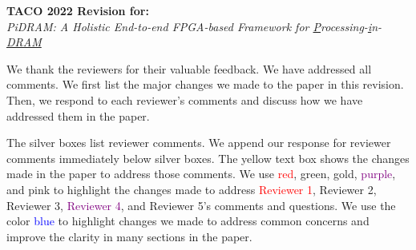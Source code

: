 


\begin{center}
    \LARGE{\textbf{TACO 2022 Revision for:}}\\
    \LARGE{\textit{PiDRAM: A Holistic End-to-end FPGA-based Framework for \underline{P}rocessing-\underline{i}n-\underline{DRAM}}}
\end{center}

\vspace{10pt}

We thank the reviewers for their valuable feedback. We have addressed all comments. We first list the major changes we made to the paper in this revision. Then, we respond to each reviewer’s comments and discuss how we have addressed them in the paper.

The silver boxes list reviewer comments. We append our response for reviewer comments immediately below silver boxes. The yellow text box shows the changes made in the paper to address those comments. We use \textcolor{red}{red}, \textcolor{dark-green}{green}, \textcolor{goldbutdark}{gold}, \textcolor{purple}{purple}, and \textcolor{pink-hot}{pink} to highlight the changes made to address \textcolor{red}{Reviewer 1}, \textcolor{dark-green}{Reviewer 2}, \textcolor{goldbutdark}{Reviewer 3}, \textcolor{purple}{Reviewer 4}, and \textcolor{pink-hot}{Reviewer 5}'s comments and questions. We use the color \textcolor{blue}{blue} to highlight changes we made to address common concerns and improve the clarity in many sections in the paper.\\

\iffalse
\newcommand{\tacoreva}[1]{\textcolor{red}{#1}}
\definecolor{dark-green}{rgb}{0.00, 0.45, 0.00}
\newcommand{\tacorevb}[1]{\textcolor{dark-green}{#1}}
\definecolor{goldbutdark}{rgb}{0.85, 0.65, 0.12}
\newcommand{\tacorevc}[1]{\textcolor{goldbutdark}{#1}}
\newcommand{\tacorevd}[1]{\textcolor{purple}{#1}}
\definecolor{pink-hot}{rgb}{0.98, 0.40, 0.78}
\newcommand{\tacoreve}[1]{\textcolor{pink-hot}{#1}}
\newcommand{\tacorevcommon}[1]{\textcolor{blue}{#1}}
\fi

